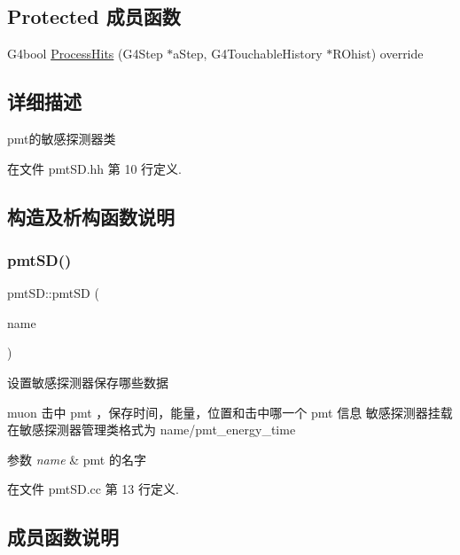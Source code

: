 \subsection*{Protected 成员函数}
\begin{DoxyCompactItemize}
\item 
G4bool \hyperlink{classpmtSD_a5d557bd42f85305418f6ddd7e4bcfe7a}{Process\+Hits} (G4\+Step $\ast$a\+Step, G4\+Touchable\+History $\ast$R\+Ohist) override
\end{DoxyCompactItemize}


\subsection{详细描述}
pmt的敏感探测器类 

在文件 pmt\+S\+D.\+hh 第 10 行定义.



\subsection{构造及析构函数说明}
\mbox{\label{classpmtSD_ae7746efb08ea75673a718fd342d243ea}} 
\subsubsection{\texorpdfstring{pmt\+S\+D()}{pmtSD()}}
{\footnotesize\ttfamily pmt\+S\+D\+::pmt\+SD (\begin{DoxyParamCaption}\item[{G4\+String}]{name }\end{DoxyParamCaption})}



设置敏感探测器保存哪些数据 

muon 击中 pmt ，保存时间，能量，位置和击中哪一个 pmt 信息 敏感探测器挂载在敏感探测器管理类格式为 name/pmt\+\_\+energy\+\_\+time 
\begin{DoxyParams}{参数}
{\em name} & pmt 的名字 \\
\hline
\end{DoxyParams}


在文件 pmt\+S\+D.\+cc 第 13 行定义.



\subsection{成员函数说明}
\mbox{\label{classpmtSD_a5241646bdc0f46e27b011bf4fa35dc07}} 
